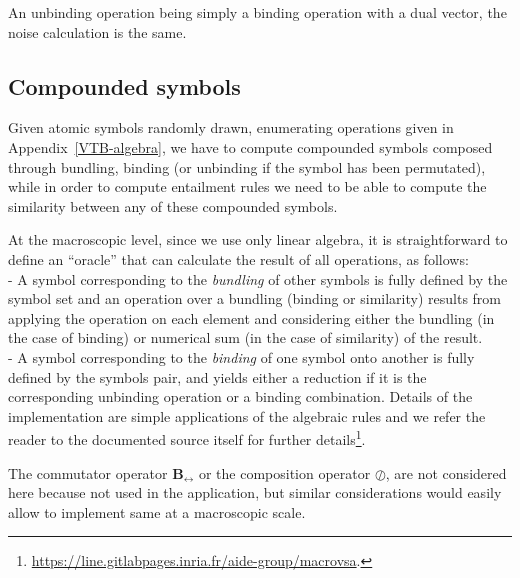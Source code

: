 \documentclass[sn-mathphys]{sn-jnl}
\newcommand{\hhref}[1]{\href{#1}{#1}}
\begin{document}
\begin{appendices}
An unbinding operation being simply a binding operation with a dual vector, the noise calculation is the same.

\subsection*{Compounded symbols}

Given atomic symbols randomly drawn, enumerating operations given in Appendix~\ref{VTB-algebra}, we have to compute compounded symbols composed through bundling, binding (or unbinding if the symbol has been permutated), while in order to compute entailment rules we need to be able to compute the similarity between any of these compounded symbols. 

At the macroscopic level, since we use only linear algebra, it is straightforward to define an ``oracle'' that can calculate the result of all operations, as follows:
\\- A symbol corresponding to the {\em bundling} of other symbols is fully defined by the symbol set and an operation over a bundling (binding or similarity) results from applying the operation on each element and considering either the bundling (in the case of binding) or numerical sum (in the case of similarity) of the result.
\\- A symbol corresponding to the {\em binding} of one symbol onto another is fully defined by the symbols pair, and yields either a reduction if it is the corresponding unbinding operation or a binding combination.
Details of the implementation are simple applications of the algebraic rules and we refer the reader to the documented source itself for further details\footnote{\hhref{https://line.gitlabpages.inria.fr/aide-group/macrovsa}.}.

The commutator operator $\mathbf{B_{\leftrightarrow}}$ or the composition operator $\oslash$, are not considered here because not used in the application, but similar considerations would easily allow to implement same at a macroscopic scale.

\end{appendices}

%

\end{document}
